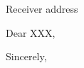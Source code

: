 \documentclass[11pt]{letter}
\begin{document}
\begin{letter}{Receiver address}
\opening{Dear XXX,}

  

\closing{Sincerely,}
\end{letter}
\end{document}
